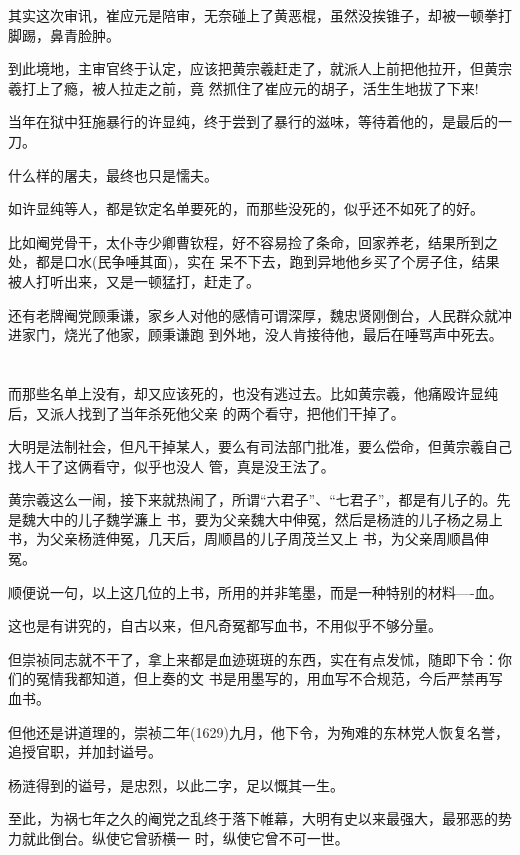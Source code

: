 \documentclass[11pt,a4paper,onecolumn]{article}
\begin{document}
其实这次审讯，崔应元是陪审，无奈碰上了黄恶棍，虽然没挨锥子，却被一顿拳打脚踢，鼻青脸肿。

到此境地，主审官终于认定，应该把黄宗羲赶走了，就派人上前把他拉开，但黄宗羲打上了瘾，被人拉走之前，竟
然抓住了崔应元的胡子，活生生地拔了下来!

当年在狱中狂施暴行的许显纯，终于尝到了暴行的滋味，等待着他的，是最后的一刀。

什么样的屠夫，最终也只是懦夫。

如许显纯等人，都是钦定名单要死的，而那些没死的，似乎还不如死了的好。

比如阉党骨干，太仆寺少卿曹钦程，好不容易捡了条命，回家养老，结果所到之处，都是口水(民争唾其面)，实在
呆不下去，跑到异地他乡买了个房子住，结果被人打听出来，又是一顿猛打，赶走了。

还有老牌阉党顾秉谦，家乡人对他的感情可谓深厚，魏忠贤刚倒台，人民群众就冲进家门，烧光了他家，顾秉谦跑
到外地，没人肯接待他，最后在唾骂声中死去。

\section[\thesection]{}

而那些名单上没有，却又应该死的，也没有逃过去。比如黄宗羲，他痛殴许显纯后，又派人找到了当年杀死他父亲
的两个看守，把他们干掉了。

大明是法制社会，但凡干掉某人，要么有司法部门批准，要么偿命，但黄宗羲自己找人干了这俩看守，似乎也没人
管，真是没王法了。

黄宗羲这么一闹，接下来就热闹了，所谓``六君子''、``七君子''，都是有儿子的。先是魏大中的儿子魏学濂上
书，要为父亲魏大中伸冤，然后是杨涟的儿子杨之易上书，为父亲杨涟伸冤，几天后，周顺昌的儿子周茂兰又上
书，为父亲周顺昌伸冤。

顺便说一句，以上这几位的上书，所用的并非笔墨，而是一种特别的材料----血。

这也是有讲究的，自古以来，但凡奇冤都写血书，不用似乎不够分量。

但崇祯同志就不干了，拿上来都是血迹斑斑的东西，实在有点发怵，随即下令：你们的冤情我都知道，但上奏的文
书是用墨写的，用血写不合规范，今后严禁再写血书。

但他还是讲道理的，崇祯二年(1629)九月，他下令，为殉难的东林党人恢复名誉，追授官职，并加封谥号。

杨涟得到的谥号，是忠烈，以此二字，足以慨其一生。

至此，为祸七年之久的阉党之乱终于落下帷幕，大明有史以来最强大，最邪恶的势力就此倒台。纵使它曾骄横一
时，纵使它曾不可一世。
\end{document}
